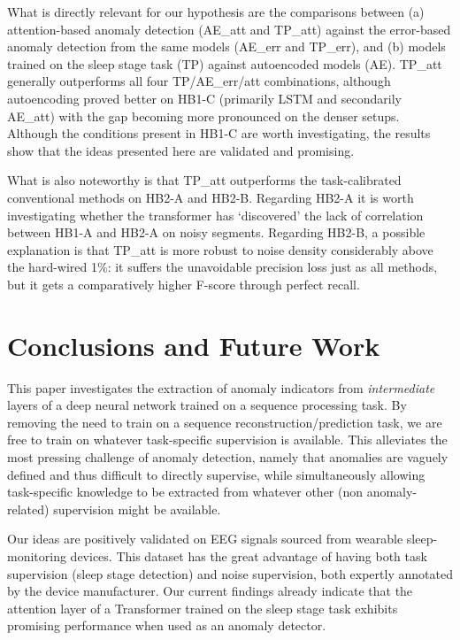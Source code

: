 \documentclass[runningheads]{llncs}
\begin{document}
What is directly relevant for our hypothesis are the comparisons
between
(a) attention-based anomaly detection (AE\_att and TP\_att) against
the error-based anomaly detection from the same models (AE\_err and
TP\_err), and (b) models trained on the sleep stage task (TP) against
autoencoded models (AE).
TP\_att generally outperforms all four TP/AE\_err/att combinations,
although autoencoding proved better on HB1-C (primarily LSTM and
secondarily AE\_att) with the gap becoming more pronounced on the
denser setups. 
Although the conditions present in HB1-C are worth investigating,
the results show that the ideas presented here are validated and
promising.

What is also noteworthy is that TP\_att outperforms the
task-calibrated conventional methods on HB2-A and HB2-B.
Regarding HB2-A it is worth investigating whether the transformer has
`discovered' the lack of correlation between HB1-A and HB2-A on noisy
segments.
Regarding HB2-B, a possible explanation is that TP\_att is more robust
to noise density considerably above the hard-wired 1\%: it suffers
the unavoidable precision loss just as all methods, but it gets a
comparatively higher F-score through perfect recall.



\section{Conclusions and Future Work}
\label{sec:conc}

This paper investigates the extraction of anomaly indicators from
\emph{intermediate} layers of a deep neural network trained on a
sequence processing task. By removing the need to train on a sequence
reconstruction/prediction task, we are free to train on whatever
task-specific supervision is available. This alleviates the most
pressing challenge of anomaly detection, namely that anomalies are
vaguely defined and thus difficult to directly supervise, while
simultaneously allowing task-specific knowledge to be extracted from
whatever other (non anomaly-related) supervision might be available.

Our ideas are positively validated on EEG signals sourced from
wearable sleep-monitoring devices. This dataset has the great
advantage of having both task supervision (sleep stage detection) and
noise supervision, both expertly annotated by the device manufacturer.
Our current findings already indicate that the attention layer of a
Transformer trained on the sleep stage task exhibits promising
performance when used as an anomaly detector.
\end{document}
